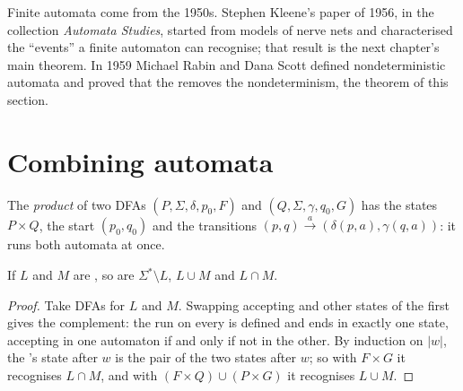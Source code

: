 \begin{history}
Finite automata come from the 1950s. Stephen Kleene's paper of 1956, in the collection \emph{Automata Studies},
started from models of nerve nets and characterised the ``events'' a finite automaton can recognise; that result is
the next chapter's main theorem. In 1959 Michael Rabin and Dana Scott defined nondeterministic automata and proved
that the  removes the nondeterminism, the theorem of this section.
\end{history}

\section{Combining automata}\label{sec:b2:finite-automata:closure}

\begin{definition}\label{def:b2:finite-automata:product}
The \emph{product} of two  DFAs $(P, \Sigma, \delta, p_0, F)$ and $(Q, \Sigma,
\gamma, q_0, G)$ has the states $P \times Q$, the start $(p_0, q_0)$ and the transitions $(p, q) \xrightarrow{a}
(\delta(p, a), \gamma(q, a))$: it runs both automata at once.
\end{definition}

\begin{proposition}\label{prop:b2:finite-automata:closure}
If $L$ and $M$ are , so are $\Sigma^* \setminus L$, $L \cup M$ and $L \cap M$.
\end{proposition}

\begin{proof}
Take  DFAs for $L$ and $M$. Swapping accepting and other states of the first gives the complement: the run on
every  is defined and ends in exactly one state, accepting in one automaton if and only if not in the other. By
induction on $|w|$, the 's state after $w$ is the pair of the two states after $w$; so with  $F
\times G$ it recognises $L \cap M$, and with $(F \times Q) \cup (P \times G)$ it recognises $L \cup M$.
\end{proof}

